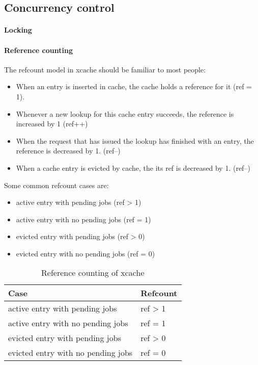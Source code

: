 \subsection{Concurrency control}\label{sec:conc-imp}

\paragraph{Locking}\label{par:lock}

\paragraph{Reference counting}\label{par:refcount-imp}

The refcount model in xcache should be familiar to most people:

\begin{itemize}
	\item When an entry is inserted in cache, the cache holds a reference 
		for it (ref = 1).
	\item Whenever a new lookup for this cache entry succeeds, the reference 
		is increased by 1 (ref++)
	\item When the request that has issued the lookup has finished with an 
		entry, the reference is decreased by 1. (ref--)
	\item When a cache entry is evicted by cache, the its ref is decreased 
		by 1. (ref--)
\end{itemize}

Some common refcount cases are:

\begin{itemize}
	\item active entry with pending jobs (ref > 1)
	\item active entry with no pending jobs (ref = 1)
	\item evicted entry with pending jobs (ref > 0)
	\item evicted entry with no pending jobs (ref = 0)
\end{itemize}

\begin{table}[tbp]
	\centering
	\begin{tabular}{ | l | l | }
		\hline
		Case & Refcount \\ \hline \hline
		active entry with pending jobs & ref > 1 \\ \hline
		active entry with no pending jobs & ref = 1 \\ \hline
		evicted entry with pending jobs & ref > 0 \\ \hline
		evicted entry with no pending jobs & ref = 0 \\ \hline
	\end{tabular}
	\caption{Reference counting of xcache}
	\label{tab:refcount}
\end{table}

